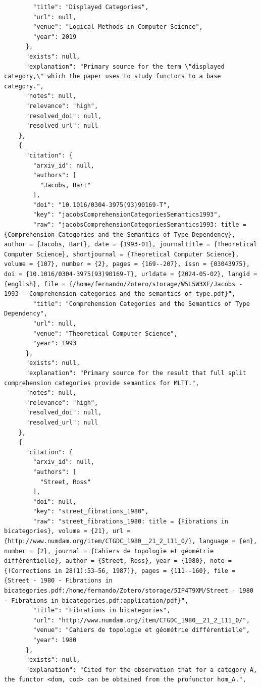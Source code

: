 \documentclass[11pt]{article}
\begin{document}
\begin{verbatim}
        "title": "Displayed Categories",
        "url": null,
        "venue": "Logical Methods in Computer Science",
        "year": 2019
      },
      "exists": null,
      "explanation": "Primary source for the term \"displayed category,\" which the paper uses to study functors to a base category.",
      "notes": null,
      "relevance": "high",
      "resolved_doi": null,
      "resolved_url": null
    },
    {
      "citation": {
        "arxiv_id": null,
        "authors": [
          "Jacobs, Bart"
        ],
        "doi": "10.1016/0304-3975(93)90169-T",
        "key": "jacobsComprehensionCategoriesSemantics1993",
        "raw": "jacobsComprehensionCategoriesSemantics1993: title = {Comprehension Categories and the Semantics of Type Dependency}, author = {Jacobs, Bart}, date = {1993-01}, journaltitle = {Theoretical Computer Science}, shortjournal = {Theoretical Computer Science}, volume = {107}, number = {2}, pages = {169--207}, issn = {03043975}, doi = {10.1016/0304-3975(93)90169-T}, urldate = {2024-05-02}, langid = {english}, file = {/home/fernando/Zotero/storage/W5L5W3XF/Jacobs - 1993 - Comprehension categories and the semantics of type.pdf}",
        "title": "Comprehension Categories and the Semantics of Type Dependency",
        "url": null,
        "venue": "Theoretical Computer Science",
        "year": 1993
      },
      "exists": null,
      "explanation": "Primary source for the result that full split comprehension categories provide semantics for MLTT.",
      "notes": null,
      "relevance": "high",
      "resolved_doi": null,
      "resolved_url": null
    },
    {
      "citation": {
        "arxiv_id": null,
        "authors": [
          "Street, Ross"
        ],
        "doi": null,
        "key": "street_fibrations_1980",
        "raw": "street_fibrations_1980: title = {Fibrations in bicategories}, volume = {21}, url = {http://www.numdam.org/item/CTGDC_1980__21_2_111_0/}, language = {en}, number = {2}, journal = {Cahiers de topologie et géométrie différentielle}, author = {Street, Ross}, year = {1980}, note = {(Corrections in 28(1):53–56, 1987)}, pages = {111--160}, file = {Street - 1980 - Fibrations in bicategories.pdf:/home/fernando/Zotero/storage/5IP4T9XM/Street - 1980 - Fibrations in bicategories.pdf:application/pdf}",
        "title": "Fibrations in bicategories",
        "url": "http://www.numdam.org/item/CTGDC_1980__21_2_111_0/",
        "venue": "Cahiers de topologie et géométrie différentielle",
        "year": 1980
      },
      "exists": null,
      "explanation": "Cited for the observation that for a category A, the functor <dom, cod> can be obtained from the profunctor hom_A.",

\end{verbatim}
\end{document}
